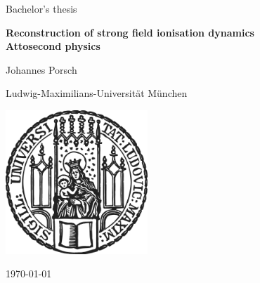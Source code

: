 \begin{titlepage}
    \centering
    
    {\Large Bachelor's thesis}
    
    \vspace{1.5cm}
    
    {\huge\bfseries Reconstruction of strong field ionisation dynamics\\[0.4cm]
    \Large Attosecond physics}
    
    \vspace{2cm}
    
    {\Large Johannes Porsch}
    
    \vspace{2cm}
    
    {\Large Ludwig-Maximilians-Universität München}
    
    \vfill
    
    \includegraphics[width = 0.4\textwidth]{figures/sigillum.png}

    \vfill
    
    {\Large \today}
    
\end{titlepage}